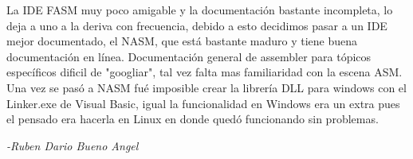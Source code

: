 
%
%
%

La IDE FASM muy poco amigable y la documentación bastante incompleta, lo deja a uno a la deriva con frecuencia, debido a esto decidimos pasar a un IDE mejor documentado, el NASM, que está bastante maduro y tiene buena documentación en línea.
Documentación general de assembler para tópicos específicos dificil de "googliar", tal vez falta mas familiaridad con la escena ASM.
Una vez se pasó a NASM fué imposible crear la librería DLL para windows con el Linker.exe de Visual Basic, igual la funcionalidad en Windows era un extra pues el pensado era hacerla en Linux en donde quedó funcionando sin problemas.


\begin{flushright} 
	\itshape{-Ruben Dario Bueno Angel}
\end{flushright}
%